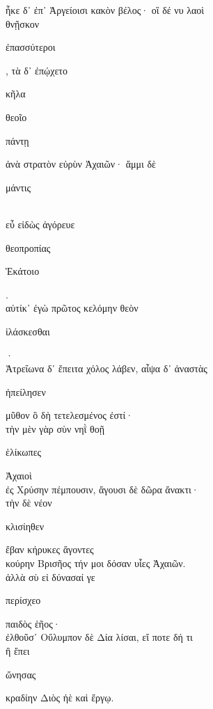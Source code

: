 \documentclass{ransom}
\begin{document}
\renewcommand{\rightheaderwhat}{\rightheaderwhatglosses}%
\begin{foreignpage}
\begin{graytext}
ἧκε δ᾽ ἐπ᾽ Ἀργείοισι κακὸν βέλος· οἳ δέ νυ λαοὶ\\
θνῇσκον \begin{whitetext}ἐπασσύτεροι\end{whitetext}, τὰ δ᾽ ἐπῴχετο \begin{whitetext}κῆλα\end{whitetext} θεοῖο\\
\begin{whitetext}πάντῃ\end{whitetext} ἀνὰ στρατὸν εὐρὺν Ἀχαιῶν· ἄμμι δὲ \begin{whitetext}μάντις\end{whitetext}\\
εὖ εἰδὼς ἀγόρευε \begin{whitetext}θεοπροπίας\end{whitetext} \begin{whitetext}Ἑκάτοιο\end{whitetext}.\hfill{}\\
αὐτίκ᾽ ἐγὼ πρῶτος κελόμην θεὸν \begin{whitetext}ἱλάσκεσθαι\end{whitetext}·\\
Ἀτρεΐωνα δ᾽ ἔπειτα χόλος λάβεν, αἶψα δ᾽ ἀναστὰς\\
\begin{whitetext}ἠπείλησεν\end{whitetext} μῦθον ὃ δὴ τετελεσμένος ἐστί·\\
τὴν μὲν γὰρ σὺν νηῒ θοῇ \begin{whitetext}ἑλίκωπες\end{whitetext} Ἀχαιοὶ\\
ἐς Χρύσην πέμπουσιν, ἄγουσι δὲ δῶρα ἄνακτι·\hfill{}\\
τὴν δὲ νέον \begin{whitetext}κλισίηθεν\end{whitetext} ἔβαν κήρυκες ἄγοντες\\
κούρην Βρισῆος τήν μοι δόσαν υἷες Ἀχαιῶν.\\
ἀλλὰ σὺ εἰ δύνασαί γε \begin{whitetext}περίσχεο\end{whitetext} παιδὸς ἑῆος·\\
ἐλθοῦσ᾽ Οὔλυμπον δὲ Δία λίσαι, εἴ ποτε δή τι\\
ἢ ἔπει \begin{whitetext}ὤνησας\end{whitetext} κραδίην Διὸς ἠὲ καὶ ἔργῳ.\hfill{}\\

\end{graytext}
\end{foreignpage}
\end{document}
